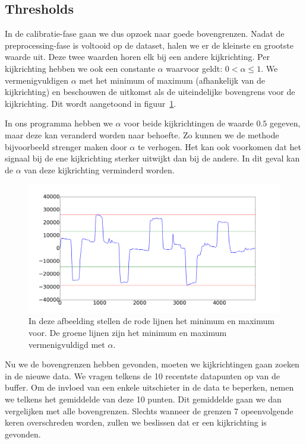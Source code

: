 \documentclass{article}
\begin{document}
\subsection{Thresholds}

In de calibratie-fase gaan we dus opzoek naar goede bovengrenzen. Nadat de preprocessing-fase is voltooid op de dataset, halen we er de kleinste en grootste waarde uit. Deze twee waarden horen elk bij een andere kijkrichting. Per kijkrichting hebben we ook een constante $\alpha$ waarvoor geldt: $0 < \alpha \leq 1$. We vermenigvuldigen $\alpha$ met het minimum of maximum (afhankelijk van de kijkrichting) en beschouwen de uitkomst als de uiteindelijke bovengrens voor de kijkrichting. Dit wordt aangetoond in figuur~\ref{fig:maxminthresholds}.

In ons programma hebben we $\alpha$ voor beide kijkrichtingen de waarde $0.5$ gegeven, maar deze kan veranderd worden naar behoefte. Zo kunnen we de methode bijvoorbeeld strenger maken door $\alpha$ te verhogen. Het kan ook voorkomen dat het signaal bij de ene kijkrichting sterker uitwijkt dan bij de andere. In dit geval kan de $\alpha$ van deze kijkrichting verminderd worden.

\begin{figure}[h]
\centering
\includegraphics[width=\linewidth]{images/thresholds_distribution}
\caption{In deze afbeelding stellen de rode lijnen het minimum en maximum voor. De groene lijnen zijn het minimum en maximum vermenigvuldigd met $\alpha$.}
\label{fig:maxminthresholds}
\end{figure}

Nu we de bovengrenzen hebben gevonden, moeten we kijkrichtingen gaan zoeken in de nieuwe data. We vragen telkens de 10 recentste datapunten op van de buffer. Om de invloed van een enkele uitschieter in de data te beperken, nemen we telkens het gemiddelde van deze 10 punten. Dit gemiddelde gaan we dan vergelijken met alle bovengrenzen. Slechts wanneer de grenzen 7 opeenvolgende keren overschreden worden, zullen we beslissen dat er een kijkrichting is gevonden.
\end{document}
